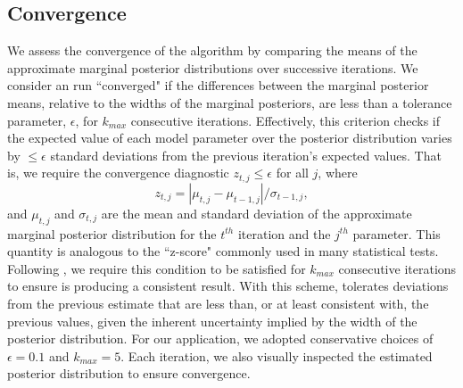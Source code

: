 
\subsection{Convergence} \label{AP:sec:app:convergence}

We assess the convergence of the \approxposterior algorithm by comparing the means of the approximate marginal posterior distributions over successive iterations. We consider an \approxposterior run ``converged" if the differences between the marginal posterior means, relative to the widths of the marginal posteriors, are less than a tolerance parameter, $\epsilon$, for $k_{max}$ consecutive iterations. Effectively, this criterion checks if the expected value of each model parameter over the posterior distribution varies by ${\leq}{\epsilon}$ standard deviations from the previous iteration's expected values. That is, we require the \approxposterior convergence diagnostic $z_{t,j}{\leq}{\epsilon}$ for all $j$, where
\begin{equation}
    z_{t,j} = |\mu_{t,j} - \mu_{t-1,j}| / \sigma_{t-1,j},
\end{equation}
 and $\mu_{t,j}$ and $\sigma_{t,j}$ are the mean and standard deviation of the approximate marginal posterior distribution for the $t^{th}$ iteration and the $j^{th}$ parameter. This quantity is analogous to the ``z-score" commonly used in many statistical tests. Following \citet{Wang2018}, we require this condition to be satisfied for $k_{max}$ consecutive iterations to ensure \approxposterior is producing a consistent result. With this scheme, \approxposterior tolerates deviations from the previous estimate that are less than, or at least consistent with, the previous values, given the inherent uncertainty implied by the width of the posterior distribution. For our application, we adopted conservative choices of $\epsilon = 0.1$ and $k_{max} = 5$. Each \approxposterior iteration, we also visually inspected the estimated posterior distribution to ensure convergence. 

